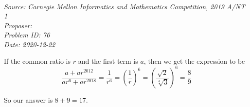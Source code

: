 \SSbreak\\
\emph{Source: Carnegie Mellon Informatics and Mathematics Competition, 2019 A/NT 1}\\
\emph{Proposer: \Pnjoy}\\
\emph{Problem ID: 76}\\
\emph{Date: 2020-12-22}\\
\SSbreak

\bigskip

\begin{solution}\hfil\medskip
    
If the common ratio is \(r\) and the first term is \(a\), then we get the expression to be 
\[\frac{a+ar^{2012}}{ar^6+ar^{2018}} = \frac{1}{r^6} = \left ( \frac1r \right ) ^6 = \left(\frac{\sqrt{2}}{\sqrt[3]{3}} \right)^6 = \frac89\]

So our answer is \( 8+9 = \boxed{17}\).
\end{solution}\bigskip
